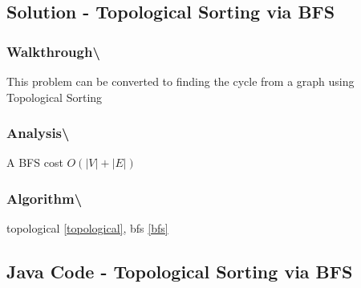 \documentclass[]{book}
\begin{document}
\hypertarget{solution---topological-sorting-via-bfs}{%
\subsection{Solution - Topological Sorting via BFS}\label{solution---topological-sorting-via-bfs}}

\hypertarget{walkthrough-99}{%
\subsubsection{Walkthrough\textbackslash{}}\label{walkthrough-99}}

This problem can be converted to finding the cycle from a graph using Topological Sorting

\hypertarget{analysis-106}{%
\subsubsection{Analysis\textbackslash{}}\label{analysis-106}}

A BFS cost \(O(|V| + |E|)\)

\hypertarget{algorithm-112}{%
\subsubsection{Algorithm\textbackslash{}}\label{algorithm-112}}

topological \ref{topological}, bfs \ref{bfs}

\hypertarget{java-code---topological-sorting-via-bfs}{%
\subsection{Java Code - Topological Sorting via BFS}\label{java-code---topological-sorting-via-bfs}}
\end{document}
